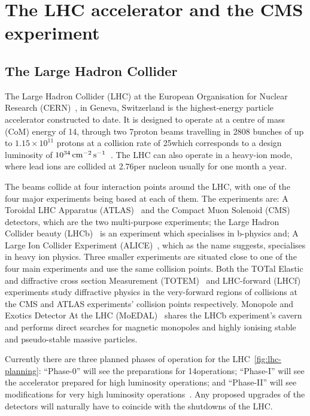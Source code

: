 \chapter{The LHC accelerator and the CMS experiment}\label{chapter:lhc-cms}
\section{The Large Hadron Collider}\label{sec:lhc}

The Large Hadron Collider (LHC) at the European Organisation for Nuclear Research (CERN)~\cite{Bruning:782076}, in Geneva, Switzerland is the highest-energy particle accelerator constructed to date. 
It is designed to operate at a centre of mass (CoM) energy of 14\TeV, through two 7\TeV proton beams travelling in 2808 bunches of up to $1.15 \times 10^{11}$ protons at a collision rate of 25\ns which corresponds to a design luminosity of $10^{34}\,\text{cm}^\text{$-$2}\,\text{s}^\text{$-$1}$~\cite{Bayatian:2006zz}. 
The LHC can also operate in a heavy-ion mode, where lead ions are collided at 2.76\TeV per nucleon usually for one month a year.

The beams collide at four interaction points around the LHC, with one of the four major experiments being based at each of them. 
The experiments are: A Toroidal LHC Apparatus (ATLAS)~\cite{Aad:2008zzm} and the Compact Muon Solenoid (CMS)~\cite{oldcms} detectors, which are the two multi-purpose experiments; the Large Hadron Collider beauty (LHCb)~\cite{Alves:2008zz} is an experiment which specialises in b-physics and; A Large Ion Collider Experiment (ALICE)~\cite{Aamodt:2008zz}, which as the name suggests, specialises in heavy ion physics.
Three smaller experiments are situated close to one of the four main experiments and use the same collision points.
Both the TOTal Elastic and diffractive cross section Measurement (TOTEM)~\cite{Anelli:2008zza} and LHC-forward (LHCf)~\cite{Adriani:2008zz} experiments study diffractive physics in the very-forward regions of collisions at the CMS and ATLAS experiments' collision points respectively.
Monopole and Exotics Detector At the LHC (MoEDAL)~\cite{Pinfold:2009oia} shares the LHCb experiment's cavern and performs direct searches for magnetic monopoles and highly ionising stable and pseudo-stable massive particles.

Currently there are three planned phases of operation for the LHC~\ref{fig:lhc-planning}: ``Phase-0'' will see the preparations for 14\TeV operations; ``Phase-I'' will see the accelerator prepared for high luminosity operations; and ``Phase-II'' will see modifications for very high luminosity operations~\cite{ECFA}. Any proposed upgrades of the detectors will naturally have to coincide with the shutdowns of the LHC.

